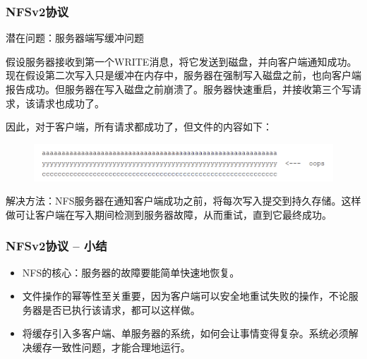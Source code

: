 \begin{frame}[fragile]
    \frametitle{NFSv2协议}
    潜在问题：服务器端写缓冲问题
    
    假设服务器接收到第一个WRITE消息，将它发送到磁盘，并向客户端通知成功。现在假设第二次写入只是缓冲在内存中，服务器在强制写入磁盘之前，也向客户端报告成功。但服务器在写入磁盘之前崩溃了。服务器快速重启，并接收第三个写请求，该请求也成功了。
    
    因此，对于客户端，所有请求都成功了，但文件的内容如下：
    
    \begin{figure}
        \includegraphics[width=0.9\linewidth]{figs/nfsv2-srv2.png}
    \end{figure} \pause
    
    解决方法：NFS服务器在通知客户端成功之前，将每次写入提交到持久存储。这样做可让客户端在写入期间检测到服务器故障，从而重试，直到它最终成功。
\end{frame}

\begin{frame}[fragile]
    \frametitle{NFSv2协议 -- 小结}
    
        \begin{itemize}
            \item NFS的核心：服务器的故障要能简单快速地恢复。
            \item 文件操作的幂等性至关重要，因为客户端可以安全地重试失败的操作，不论服务器是否已执行该请求，都可以这样做。
            \item 将缓存引入多客户端、单服务器的系统，如何会让事情变得复杂。系统必须解决缓存一致性问题，才能合理地运行。
            
            
        \end{itemize}
    
%    
\end{frame}

